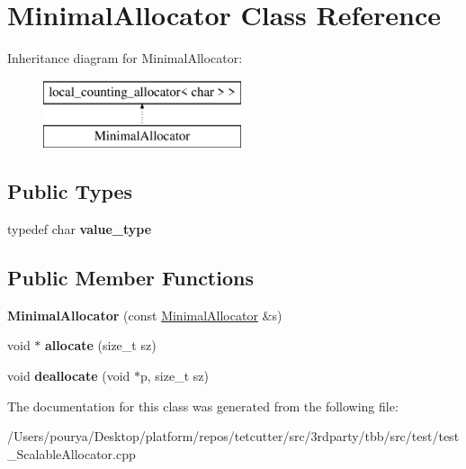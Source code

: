 \hypertarget{classMinimalAllocator}{}\section{Minimal\+Allocator Class Reference}
\label{classMinimalAllocator}
Inheritance diagram for Minimal\+Allocator\+:\begin{figure}[H]
\begin{center}
\leavevmode
\includegraphics[height=2.000000cm]{classMinimalAllocator}
\end{center}
\end{figure}
\subsection*{Public Types}
\begin{DoxyCompactItemize}
\item 
\hypertarget{classMinimalAllocator_a07da595942a56052f786573486d8b2a3}{}typedef char {\bfseries value\+\_\+type}\label{classMinimalAllocator_a07da595942a56052f786573486d8b2a3}

\end{DoxyCompactItemize}
\subsection*{Public Member Functions}
\begin{DoxyCompactItemize}
\item 
\hypertarget{classMinimalAllocator_a79ce5991f8d5c9843943094400c9e382}{}{\bfseries Minimal\+Allocator} (const \hyperlink{classMinimalAllocator}{Minimal\+Allocator} \&s)\label{classMinimalAllocator_a79ce5991f8d5c9843943094400c9e382}

\item 
\hypertarget{classMinimalAllocator_a9b17bb78d6587936ba05b1ffc3c69c36}{}void $\ast$ {\bfseries allocate} (size\+\_\+t sz)\label{classMinimalAllocator_a9b17bb78d6587936ba05b1ffc3c69c36}

\item 
\hypertarget{classMinimalAllocator_a342957550883cd332cec4ed052e77113}{}void {\bfseries deallocate} (void $\ast$p, size\+\_\+t sz)\label{classMinimalAllocator_a342957550883cd332cec4ed052e77113}

\end{DoxyCompactItemize}


The documentation for this class was generated from the following file\+:\begin{DoxyCompactItemize}
\item 
/\+Users/pourya/\+Desktop/platform/repos/tetcutter/src/3rdparty/tbb/src/test/test\+\_\+\+Scalable\+Allocator.\+cpp\end{DoxyCompactItemize}
